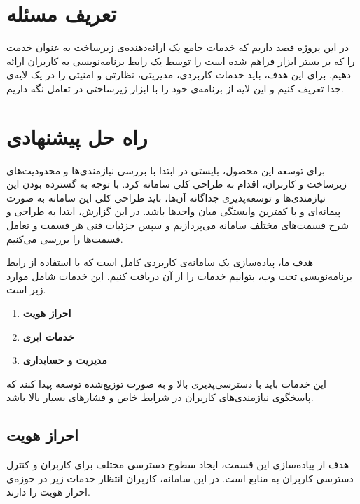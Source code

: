 \section{تعریف مسئله}
در این پروژه قصد داریم که خدمات جامع یک ارائه‌دهنده‌ی زیرساخت به عنوان خدمت را که بر بستر ابزار  فراهم شده است را توسط یک رابط برنامه‌نویسی به کاربران ارائه دهیم. برای این هدف، باید خدمات کاربردی، مدیریتی، نظارتی و امنیتی را در یک لایه‌ی جدا تعریف کنیم و این لایه از برنامه‌ی خود را با ابزار زیرساختی در تعامل نگه داریم. 
\section{راه حل پیشنهادی}
برای توسعه این محصول، بایستی در ابتدا با بررسی نیازمندی‌ها و محدودیت‌های زیرساخت و کاربران، اقدام به طراحی کلی سامانه کرد. با توجه به گسترده بودن این نیازمندی‌ها و توسعه‌پذیری جداگانه آن‌ها، باید طراحی کلی این سامانه به صورت پیمانه‌ای و با کمترین وابستگی میان واحد‌ها باشد. در این گزارش، ابتدا به طراحی و شرح قسمت‌های مختلف سامانه می‌پردازیم و سپس جزئیات فنی هر قسمت و تعامل قسمت‌ها را بررسی می‌کنیم.


هدف ما، پیاده‌سازی یک سامانه‌ی کاربردی کامل است که با استفاده از رابط برنامه‌نویسی تحت وب، بتوانیم خدمات را از آن دریافت کنیم. این خدمات شامل موارد زیر است.

\begin{enumerate}
	\item \textbf{احراز هویت}
	
	\item \textbf{خدمات ابری}
	
	\item \textbf{مدیریت و حسابداری}
\end{enumerate}

این خدمات باید با دسترسی‌پذیری بالا و به صورت توزیع‌شده توسعه پیدا کنند که پاسخگوی نیازمندی‌های کاربران در شرایط خاص و فشار‌های بسیار بالا باشد.

\subsection{احراز هویت}
هدف از پیاده‌سازی این قسمت، ایجاد سطوح دسترسی مختلف برای کاربران و کنترل دسترسی کاربران به منابع است. در این سامانه، کاربران انتظار خدمات زیر در حوزه‌ی احراز هویت را دارند.

